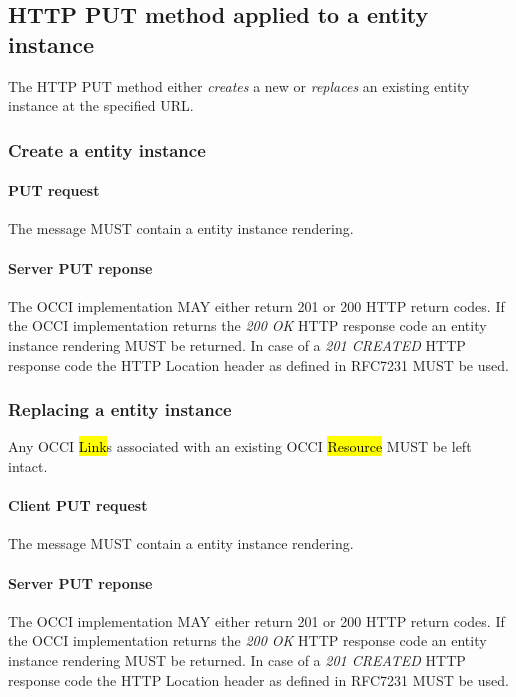 \documentclass[10pt,a4paper]{article}
\begin{document}
\subsection{HTTP PUT method applied to a entity instance}
The HTTP PUT method either {\em creates} a new or {\em replaces} an existing entity instance at the specified URL.

\subsubsection{Create a entity instance}

\paragraph{PUT request}
The message MUST contain a entity instance rendering.

\paragraph{Server PUT reponse}
The OCCI implementation MAY either return 201 or 200 HTTP return codes. If the OCCI implementation
returns the \emph{200 OK} HTTP response code an entity instance rendering MUST be returned. 
In case of a \emph{201 CREATED} HTTP response code the HTTP Location header as defined in RFC7231 \cite{rfc7231} MUST be used.

\subsubsection{Replacing a entity instance}
Any OCCI \hl{Link}s associated with an existing OCCI \hl{Resource} MUST be left intact.

\paragraph{Client PUT request}
The message MUST contain a entity instance rendering.

\paragraph{Server PUT reponse}
The OCCI implementation MAY either return 201 or 200 HTTP return codes.  If the OCCI implementation
returns the \emph{200 OK} HTTP response code an entity instance rendering MUST be returned. 
In case of a \emph{201 CREATED} HTTP response code the HTTP Location header as defined in RFC7231 \cite{rfc7231} MUST be used.
\end{document}
